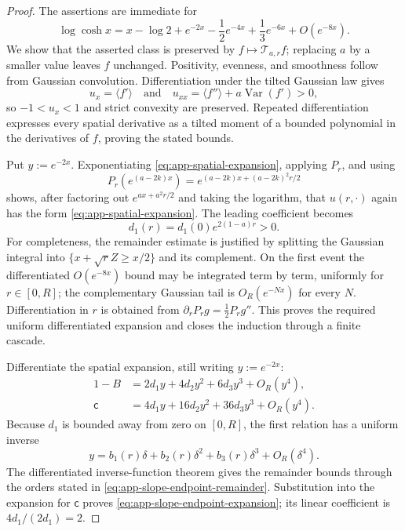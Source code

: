 \documentclass[10pt]{amsart}
\theoremstyle{definition}
\theoremstyle{remark}
\numberwithin{equation}{section}
\newcommand{\1}{\mathbf 1}
\newcommand{\Var}{\operatorname{Var}}
\begin{document}
\begin{proof}
The assertions are immediate for
\begin{equation*}
 \log\cosh x=x-\log2+e^{-2x}-\frac12e^{-4x}
 +\frac13e^{-6x}+O(e^{-8x}).
\end{equation*}
We show that the asserted class is preserved by $f\mapsto\mathcal T_{a,r}f$; replacing $a$ by a smaller value leaves $f$ unchanged. Positivity, evenness, and smoothness follow from Gaussian convolution. Differentiation under the tilted Gaussian law gives
\begin{equation*}
 u_x=\langle f'\rangle
 \quad\text{and}\quad
 u_{xx}=\langle f''\rangle+a\Var(f')>0,
\end{equation*}
so $-1<u_x<1$ and strict convexity are preserved.  Repeated differentiation expresses every spatial derivative as a tilted moment of a bounded polynomial in the derivatives of $f$, proving the stated bounds.

Put $y:=e^{-2x}$.  Exponentiating \eqref{eq:app-spatial-expansion}, applying $P_r$, and using
\begin{equation*}
 P_r(e^{(a-2k)x})
 =e^{(a-2k)x+(a-2k)^2r/2}
\end{equation*}
shows, after factoring out $e^{ax+a^2r/2}$ and taking the logarithm, that $u(r,\cdot)$ again has the form \eqref{eq:app-spatial-expansion}.  The leading coefficient becomes
\begin{equation}
 d_1(r)=d_1(0)e^{2(1-a)r}>0.
 \label{eq:app-leading-coefficient}
\end{equation}
For completeness, the remainder estimate is justified by splitting the Gaussian integral into $\{x+\sqrt rZ\geq x/2\}$ and its complement.  On the first event the differentiated $O(e^{-8x})$ bound may be integrated term by term, uniformly for $r\in[0,R]$; the complementary Gaussian tail is $O_R(e^{-Nx})$ for every $N$.  Differentiation in $r$ is obtained from $\partial_rP_rg=\frac12P_rg''$.  This proves the required uniform differentiated expansion and closes the induction through a finite cascade.

Differentiate the spatial expansion, still writing $y:=e^{-2x}$:
\begin{align*}
 1-B&=2d_1y+4d_2y^2+6d_3y^3+O_R(y^4),\\
 \mathsf c&=4d_1y+16d_2y^2+36d_3y^3+O_R(y^4).
\end{align*}
Because $d_1$ is bounded away from zero on $[0,R]$, the first relation has a uniform inverse
\begin{equation*}
 y=b_1(r)\delta+b_2(r)\delta^2+b_3(r)\delta^3
 +O_R(\delta^4).
\end{equation*}
The differentiated inverse-function theorem gives the remainder bounds through the orders stated in \eqref{eq:app-slope-endpoint-remainder}.  Substitution into the expansion for $\mathsf c$ proves \eqref{eq:app-slope-endpoint-expansion}; its linear coefficient is $4d_1/(2d_1)=2$.
\end{proof}
\end{document}
